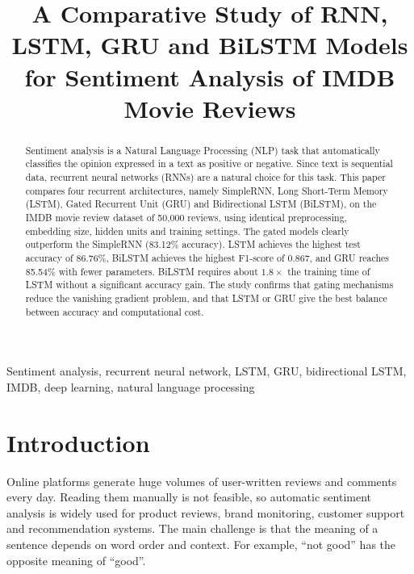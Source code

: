 \documentclass[conference]{IEEEtran}
\begin{document}
\title{A Comparative Study of RNN, LSTM, GRU and BiLSTM Models for Sentiment Analysis of IMDB Movie Reviews}

\author{
}

\maketitle

\begin{abstract}
Sentiment analysis is a Natural Language Processing (NLP) task that automatically classifies the opinion expressed in a text as positive or negative. Since text is sequential data, recurrent neural networks (RNNs) are a natural choice for this task. This paper compares four recurrent architectures, namely SimpleRNN, Long Short-Term Memory (LSTM), Gated Recurrent Unit (GRU) and Bidirectional LSTM (BiLSTM), on the IMDB movie review dataset of 50,000 reviews, using identical preprocessing, embedding size, hidden units and training settings. The gated models clearly outperform the SimpleRNN (83.12\% accuracy). LSTM achieves the highest test accuracy of 86.76\%, BiLSTM achieves the highest F1-score of 0.867, and GRU reaches 85.54\% with fewer parameters. BiLSTM requires about $1.8\times$ the training time of LSTM without a significant accuracy gain. The study confirms that gating mechanisms reduce the vanishing gradient problem, and that LSTM or GRU give the best balance between accuracy and computational cost.
\end{abstract}

\begin{IEEEkeywords}
Sentiment analysis, recurrent neural network, LSTM, GRU, bidirectional LSTM, IMDB, deep learning, natural language processing
\end{IEEEkeywords}

\section{Introduction}
Online platforms generate huge volumes of user-written reviews and comments every day. Reading them manually is not feasible, so automatic sentiment analysis is widely used for product reviews, brand monitoring, customer support and recommendation systems. The main challenge is that the meaning of a sentence depends on word order and context. For example, ``not good'' has the opposite meaning of ``good''.
\end{document}
